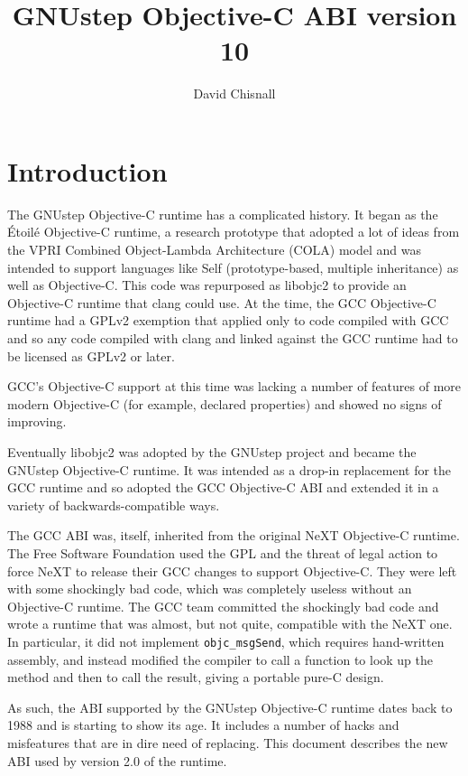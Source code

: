 \documentclass[a4paper]{report}
\title{GNUstep Objective-C ABI version 10}
\author{David Chisnall}
\newcommand{\file}[1]{\textsf{#1}}
\newcommand{\ccode}[1]{\lstinline[language={C}]{#1}}
\begin{document}
\maketitle{}
\tableofcontents

\chapter{Introduction}

The GNUstep Objective-C runtime has a complicated history.
It began as the Étoilé Objective-C runtime, a research prototype that adopted a lot of ideas from the VPRI Combined Object-Lambda Architecture (COLA) model and was intended to support languages like Self (prototype-based, multiple inheritance) as well as Objective-C.
This code was repurposed as \file{libobjc2} to provide an Objective-C runtime that clang could use.
At the time, the GCC Objective-C runtime had a GPLv2 exemption that applied only to code compiled with GCC and so any code compiled with clang and linked against the GCC runtime had to be licensed as GPLv2 or later.

GCC's Objective-C support at this time was lacking a number of features of more modern Objective-C (for example, declared properties) and showed no signs of improving.

Eventually \file{libobjc2} was adopted by the GNUstep project and became the GNUstep Objective-C runtime.
It was intended as a drop-in replacement for the GCC runtime and so adopted the GCC Objective-C ABI and extended it in a variety of backwards-compatible ways.

The GCC ABI was, itself, inherited from the original NeXT Objective-C runtime.
The Free Software Foundation used the GPL and the threat of legal action to force NeXT to release their GCC changes to support Objective-C.
They were left with some shockingly bad code, which was completely useless without an Objective-C runtime.
The GCC team committed the shockingly bad code and wrote a runtime that was almost, but not quite, compatible with the NeXT one.
In particular, it did not implement \ccode{objc_msgSend}, which requires hand-written assembly, and instead modified the compiler to call a function to look up the method and then to call the result, giving a portable pure-C design.

As such, the ABI supported by the GNUstep Objective-C runtime dates back to 1988 and is starting to show its age.
It includes a number of hacks and misfeatures that are in dire need of replacing.
This document describes the new ABI used by version 2.0 of the runtime.
\end{document}
